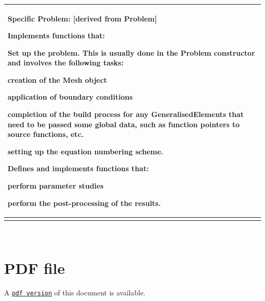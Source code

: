 \begin{center}
\begin{longtabu}
\begin{center}
\begin{tabularx}{\linewidth}{|*{1}{>{\raggedright\arraybackslash}X|}}
\begin{center} {\bfseries Specific Problem\+:}
\mbox{[}derived from {\bfseries Problem}\mbox{]} \end{center} 
\begin{DoxyItemize}
\item Implements functions that\+:
\begin{DoxyItemize}
\item Set up the problem. This is usually done in the {\ttfamily Problem} constructor and involves the following tasks\+:
\begin{DoxyItemize}
\item creation of the {\ttfamily Mesh} object
\item application of boundary conditions
\item completion of the build process for any {\ttfamily Generalised\+Elements} that need to be passed some global data, such as function pointers to source functions, etc.
\item setting up the equation numbering scheme.
\end{DoxyItemize}
\end{DoxyItemize}
\item Defines and implements functions that\+:
\begin{DoxyItemize}
\item perform parameter studies
\item perform the post-\/processing of the results.   
\end{DoxyItemize}
\end{DoxyItemize}\\\cline{1-1}
\end{tabularx}
\end{center}    \\
\end{longtabu}
\end{center} 



 





 

 \hypertarget{index_pdf}{}\section{P\+D\+F file}\label{index_pdf}
A \href{../latex/refman.pdf}{\tt pdf version} of this document is available. 
